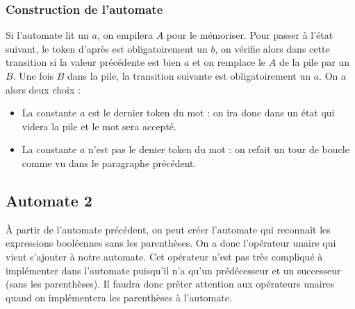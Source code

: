 \documentclass{Support}
\begin{document}
\begin{center}
\end{center}

\subsubsection*{Construction de l'automate}
Si l'automate lit un $a$, on empilera $A$ pour le mémoriser. Pour passer à l'état suivant, le token d'après est obligatoirement un $b$, on vérifie alors dans cette transition si la valeur précédente est bien $a$ et on remplace le $A$ de la pile par un $B$. Une fois $B$ dans la pile, la transition suivante est obligatoirement un $a$. On a alors deux choix : 
\begin{itemize}
    \item La constante $a$ est le dernier token du mot : on ira donc dans un état qui videra la pile et le mot sera accepté.
    \item La constante $a$ n'est pas le denier token du mot : on refait un tour de boucle comme vu dans le paragraphe précédent.
\end{itemize}

\subsection{Automate 2}
À partir de l'automate précédent, on peut créer l'automate qui reconnaît les expressions booléennes sans les parenthèses. On a donc l'opérateur unaire qui vient s'ajouter à notre automate. Cet opérateur n'est pas très compliqué à implémenter dans l'automate puisqu'il n'a qu'un prédécesseur et un successeur (sans les parenthèses). Il faudra donc prêter attention aux opérateurs unaires quand on implémentera les parenthèses à l'automate.
\end{document}
